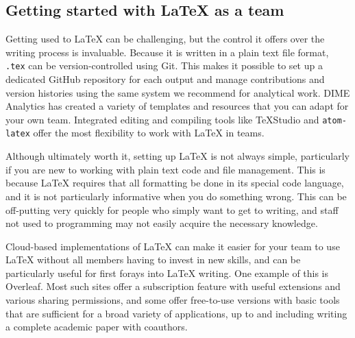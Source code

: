 \subsection{Getting started with {\LaTeX} as a team}

Getting used to {\LaTeX} can be challenging,
but the control it offers over the writing process is invaluable.
Because it is written in a plain text file format,
\texttt{.tex} can be version-controlled using Git.
This makes it possible to set up a dedicated GitHub repository for each output
and manage contributions and version histories
using the same system we recommend for analytical work.
DIME Analytics has created a variety of templates and resources
that you can adapt for your own team.
Integrated editing and compiling tools like TeXStudio
and \texttt{atom-latex}
offer the most flexibility to work with {\LaTeX} in teams.

Although ultimately worth it, setting up {\LaTeX} is not always simple,
particularly if you are new to working with plain text code and file management.
This is because {\LaTeX} requires that all formatting be done in its special code language,
and it is not particularly informative when you do something wrong.
This can be off-putting very quickly for people
who simply want to get to writing, 
and staff not used to programming may not easily acquire the necessary knowledge.

Cloud-based implementations of {\LaTeX} can make it easier for your team to use
{\LaTeX} without all members having to invest in new skills, 
and can be particularly useful for first forays into {\LaTeX} writing. 
One example of this is Overleaf.
Most such sites offer a subscription feature
with useful extensions and various sharing permissions,
and some offer free-to-use versions with basic tools that are sufficient
for a broad variety of applications,
up to and including writing a complete academic paper with coauthors.

